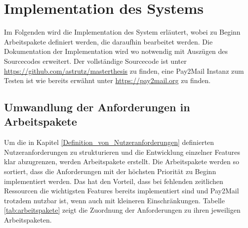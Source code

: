 \chapter{Implementation des Systems}
\label{Implementation_des_Systems}
Im Folgenden wird die Implementation des System erläutert, wobei zu Beginn Arbeitspakete definiert werden, die daraufhin bearbeitet werden. Die Dokumentation der Implementation wird wo notwendig mit Auszügen des Sourcecodes erweitert. Der vollständige Sourcecode ist unter \url{https://github.com/astrutz/masterthesis} zu finden, eine Pay2Mail Instanz zum Testen ist wie bereits erwähnt unter \url{https://pay2mail.org} zu finden.

\section{Umwandlung der Anforderungen in Arbeitspakete}
Um die in Kapitel \ref{Definition_von_Nutzeranforderungen} definierten Nutzeranforderungen zu strukturieren und die Entwicklung einzelner Features klar abzugrenzen, werden Arbeitspakete erstellt. Die Arbeitspakete werden so sortiert, dass die Anforderungen mit der höchsten Priorität zu Beginn implementiert werden. Das hat den Vorteil, dass bei fehlenden zeitlichen Ressourcen die wichtigsten Features bereits implementiert sind und Pay2Mail trotzdem nutzbar ist, wenn auch mit kleineren Einschränkungen. Tabelle \ref{tab:arbeitspakete} zeigt die Zuordnung der Anforderungen zu ihren jeweiligen Arbeitspaketen.

